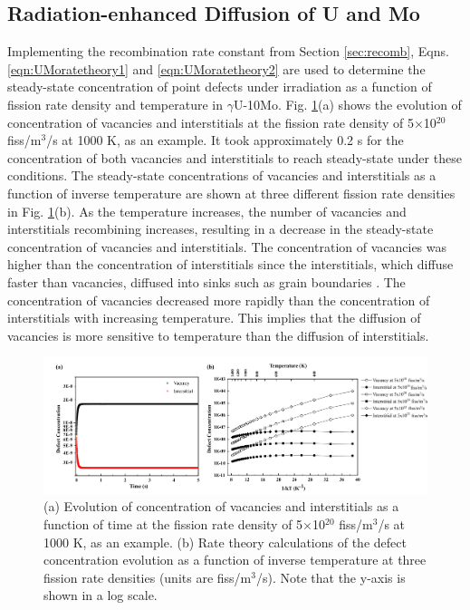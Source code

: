 \documentclass[preprint,12pt]{elsarticle}
\begin{document}
\subsection{Radiation-enhanced Diffusion of U and Mo}\label{sec:RED_UMo}
Implementing the recombination rate constant from Section \ref{sec:recomb}, Eqns. \ref{eqn:UMoratetheory1} and \ref{eqn:UMoratetheory2} are used to determine the steady-state concentration of point defects under irradiation as a function of fission rate density and temperature in $\gamma$U-10Mo. Fig. \ref{fig:def_conc}(a) shows the evolution of concentration of vacancies and interstitials at the fission rate density of 5$\times$10$^{20}$ fiss/m$^{3}$/s at 1000 K, as an example. It took approximately 0.2 s for the concentration of both vacancies and interstitials to reach steady-state under these conditions. The steady-state concentrations of vacancies and interstitials as a function of inverse temperature are shown at three different fission rate densities in Fig. \ref{fig:def_conc}(b). As the temperature increases, the number of vacancies and interstitials recombining increases, resulting in a decrease in the steady-state concentration of vacancies and interstitials. The concentration of vacancies was higher than the concentration of interstitials since the interstitials, which diffuse faster than vacancies, diffused into sinks such as grain boundaries \cite{park2021atomistic, smirnova2015atomistic}. The concentration of vacancies decreased more rapidly than the concentration of interstitials with increasing temperature. This implies that the diffusion of vacancies is more sensitive to temperature than the diffusion of interstitials.

\begin{figure}[hbt!]
\centering
\includegraphics[width=1\textwidth]{Fig3.png}
\caption{(a) Evolution of concentration of vacancies and interstitials as a function of time at the fission rate density of 5$\times$10$^{20}$ fiss/m$^{3}$/s at 1000 K, as an example. (b) Rate theory calculations of the defect concentration evolution as a function of inverse temperature at three fission rate densities (units are fiss/m$^{3}$/s). Note that the y-axis is shown in a log scale.}
\label{fig:def_conc}
\end{figure}
\end{document}
